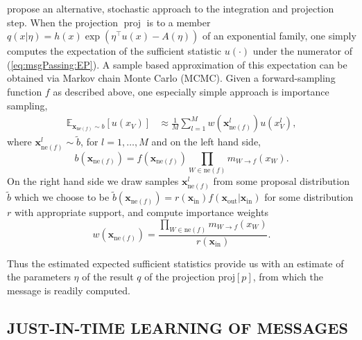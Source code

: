\documentclass[english]{article}
\theoremstyle{plain}
\theoremstyle{plain}
\newcommand{\factor}{f}				%
\newcommand{\outV}{V}                         %
\newcommand{\fis}[1]{\mathrm{ne}(#1)}   	%
\newcommand{\fx}[1]{ \mathbf{x}_{\mathrm{ne}(#1)} }   	%
\newcommand{\xin}{\mathbf{x}_{ \mathrm{in} }} 			%
\newcommand{\xout}{\mathbf{x}_{ \mathrm{out} }}			%
\newcommand{\msg}[2]{m_{#1 \rightarrow #2}}			%
\newcommand{\projP}[1]{\mathrm{proj} \left [ #1 \right]}
\DeclareMathOperator*{\proj}{\text{proj}} %
\newcommand{\expectationE}[2]{ \mathbb{E}_{#2}  \left[ #1 \right] }
\newcommand{\wjnote}[1]{ }
\newcommand{\dsnote}[1]{}%
\begin{document}
\citet{Barthelme2011,Heess2013,Eslami2014} propose an alternative, stochastic approach to the integration and projection step.
When the projection $\proj$ is to a member $q(x|\eta)=h(x)\exp\left(\eta^{\top}u(x)-A(\eta)\right)$ of an exponential family, one simply computes the expectation of the sufficient statistic $u(\cdot)$ under the numerator of (\ref{eq:msgPassing:EP}).
A sample based approximation of this expectation can be obtained via Markov chain Monte Carlo (MCMC). 
Given a forward-sampling function $f$ as described above, one especially simple approach is importance sampling, 
\begin{align}
\expectationE{u(x_{\outV})}{\fx{\factor}\sim b }
&\approx \frac{1}{M} \sum_{l=1}^M w(\fx{\factor}^l) u(x_{\outV}^l),
\label{eq:msgIS}
\end{align}
where $\fx{\factor}^l \sim \tilde{b}$, for $l=1,\ldots,M$ and on the left hand side, 
%
\begin{equation*}
b(\fx{\factor}) = \factor (\fx{\factor}) \prod_{W \in \fis{\factor}} \msg{W}{\factor}(x_{W}). 
\end{equation*}
On the right hand side we draw samples $\fx{\factor}^l$ from some proposal distribution $\tilde{b}$ which we choose to be 
%
$\tilde{b}(\fx{\factor}) = r(\xin)\factor(\xout | \xin)$
%
for some distribution $r$ with appropriate support, and compute importance weights 
\begin{equation*}
w(\fx{\factor}) = \frac{\prod_{W \in \fis{\factor}} \msg{W}{\factor}(x_{W})}{r(\xin)}.
\end{equation*}

Thus the estimated expected sufficient statistics provide us with an estimate of the parameters $\eta$ of the result $q$ of the projection $\projP{p}$, from which the message is readily computed.\dsnote{isn't $\eta$ the actual message?}



\subsection{JUST-IN-TIME LEARNING OF MESSAGES}
\label{sec:EP:JIT}
\end{document}
